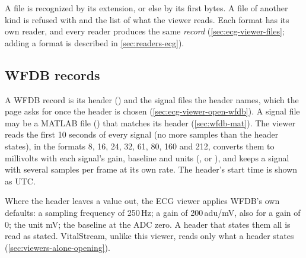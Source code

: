 A file is recognized by its extension, or else by its first bytes. A file of another kind is
refused with  and the list of what the viewer reads.
Each format has its own reader, and every reader produces the same \emph{record}
(\cref{sec:ecg-viewer-files}; adding a format is described in \cref{sec:readers-ecg}).

\subsection{WFDB records}
\label{sec:ecg-viewer-wfdb}

A WFDB record is its header () and the signal files the header names, which the page
asks for once the header is chosen (\cref{sec:ecg-viewer-open-wfdb}). A signal file may be a
MATLAB file () that matches its header (\cref{sec:wfdb-mat}). The viewer reads the
first 10 seconds of every signal (no more samples than the header states), in the formats 8, 16,
24, 32, 61, 80, 160 and 212, converts them to millivolts with each signal's gain, baseline and units (,
 or ), and keeps a signal with several samples per frame at its own rate. The
header's start time is shown as UTC.

\begin{note}
Where the header leaves a value out, the ECG viewer applies WFDB's own defaults: a sampling
frequency of 250\,Hz; a gain of 200\,adu/mV, also for a gain of 0; the unit mV; the baseline at
the ADC zero. A header that states them all is read as stated. VitalStream, unlike this viewer,
reads only what a header states (\cref{sec:viewers-alone-opening}).
\end{note}

